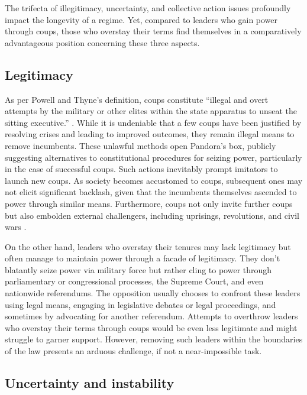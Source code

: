 \documentclass[
  12pt,
  a4paper,
  12pt]{article}
\begin{document}
The trifecta of illegitimacy, uncertainty, and collective action issues
profoundly impact the longevity of a regime. Yet, compared to leaders
who gain power through coups, those who overstay their terms find
themselves in a comparatively advantageous position concerning these
three aspects.

\hypertarget{legitimacy}{%
\subsection{Legitimacy}\label{legitimacy}}

As per Powell and Thyne's definition, coups constitute ``illegal and
overt attempts by the military or other elites within the state
apparatus to unseat the sitting executive.'' \citep[p.252]{powell2011}.
While it is undeniable that a few coups have been justified by resolving
crises and leading to improved outcomes, they remain illegal means to
remove incumbents. These unlawful methods open Pandora's box, publicly
suggesting alternatives to constitutional procedures for seizing power,
particularly in the case of successful coups. Such actions inevitably
prompt imitators to launch new coups. As society becomes accustomed to
coups, subsequent ones may not elicit significant backlash, given that
the incumbents themselves ascended to power through similar means.
Furthermore, coups not only invite further coups but also embolden
external challengers, including uprisings, revolutions, and civil wars
\citep{dahl2023}.

On the other hand, leaders who overstay their tenures may lack
legitimacy but often manage to maintain power through a facade of
legitimacy. They don't blatantly seize power via military force but
rather cling to power through parliamentary or congressional processes,
the Supreme Court, and even nationwide referendums. The opposition
usually chooses to confront these leaders using legal means, engaging in
legislative debates or legal proceedings, and sometimes by advocating
for another referendum. Attempts to overthrow leaders who overstay their
terms through coups would be even less legitimate and might struggle to
garner support. However, removing such leaders within the boundaries of
the law presents an arduous challenge, if not a near-impossible task.

\hypertarget{uncertainty-and-instability}{%
\subsection{Uncertainty and
instability}\label{uncertainty-and-instability}}
\end{document}
